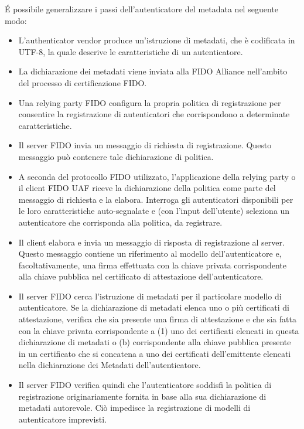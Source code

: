 \'E possibile generalizzare i passi dell'autenticatore del metadata nel seguente modo:
\begin{itemize}
    \item L'authenticator vendor produce un'istruzione di metadati, che è codificata in UTF-8, la quale descrive le caratteristiche di un autenticatore.
    \item La dichiarazione dei metadati viene inviata alla FIDO Alliance nell'ambito del processo di certificazione FIDO. 
    \item Una relying party FIDO configura la propria politica di registrazione per consentire la registrazione di autenticatori che corrispondono a determinate caratteristiche.
    \item Il server FIDO invia un messaggio di richiesta di registrazione. Questo messaggio può contenere tale dichiarazione di politica.
    \item A seconda del protocollo FIDO utilizzato, l'applicazione della relying party o il client FIDO UAF riceve la dichiarazione della politica come parte del messaggio di richiesta e la elabora. Interroga gli autenticatori disponibili per le loro caratteristiche auto-segnalate e (con l'input dell'utente) seleziona un autenticatore che corrisponda alla politica, da registrare.
    \item Il client elabora e invia un messaggio di risposta di registrazione al server. Questo messaggio contiene un riferimento al modello dell'autenticatore e, facoltativamente, una firma effettuata con la chiave privata corrispondente alla chiave pubblica nel certificato di attestazione dell'autenticatore.
    \item Il server FIDO cerca l'istruzione di metadati per il particolare modello di autenticatore. Se la dichiarazione di metadati elenca uno o più certificati di attestazione, verifica che sia presente una firma di attestazione e che sia fatta con la chiave privata corrispondente a (1) uno dei certificati elencati in questa dichiarazione di metadati o (b) corrispondente alla chiave pubblica presente in un certificato che si concatena a uno dei certificati dell'emittente elencati nella dichiarazione dei Metadati dell'autenticatore.
    \item Il server FIDO verifica quindi che l'autenticatore soddisfi la politica di registrazione originariamente fornita in base alla sua dichiarazione di metadati autorevole. Ciò impedisce la registrazione di modelli di autenticatore imprevisti.
\end{itemize}

